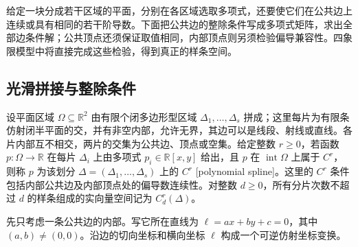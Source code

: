 %
%
%


给定一块分成若干区域的平面，分别在各区域选取多项式，还要使它们在公共边上连续或具有相同的若干阶导数。下面把公共边的整除条件写成多项式矩阵，求出全部边条件解；公共顶点还须保证取值相同，内部顶点则另须检验偏导兼容性。四象限模型中将直接完成这些检验，得到真正的样条空间。

\subsection{光滑拼接与整除条件}
\label{b3:subsec:2106:01}

\begin{definition}\label{b3:def:polynomial-spline}
	设平面区域 \(\Omega\subseteq\mathbb R^2\) 由有限个闭多边形型区域 \(\Delta_1,\ldots,\Delta_s\) 拼成；这里每片为有限条仿射闭半平面的交，并有非空内部，允许无界，其边可以是线段、射线或直线。各片内部互不相交，两片的交集为公共边、顶点或空集。给定整数 \(r\ge0\)，若函数 \(p:\Omega\to\mathbb R\) 在每片 \(\Delta_i\) 上由多项式 \(p_i\in\mathbb R[x,y]\) 给出，且 \(p\) 在 \(\operatorname{int}\Omega\) 上属于 \(C^r\)，则称 \(p\) 为该划分 \(\Delta=(\Delta_1,\ldots,\Delta_s)\) 上的 \(C^r\) [polynomial spline]。这里的 \(C^r\) 条件包括内部公共边及内部顶点处的偏导数连续性。对整数 \(d\ge0\)，所有分片次数不超过 \(d\) 的样条组成的实向量空间记为 \(C_d^r(\Delta)\)。
\end{definition}

先只考虑一条公共边的内部。写它所在直线为 \(\ell=ax+by+c=0\)，其中 \((a,b)\ne(0,0)\)。沿边的切向坐标和横向坐标 \(\ell\) 构成一个可逆仿射坐标变换。

